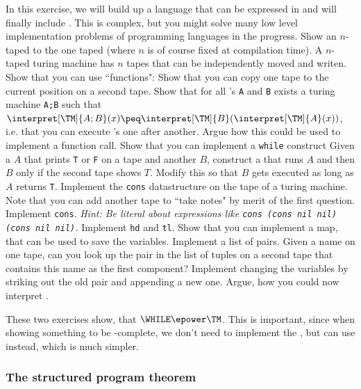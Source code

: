 \begin{Exercise}[title={Interpreter for \WHILE in \TM},difficulty=4]
	In this exercise, we will build up a language that can be expressed in \TM 
	and will finally include \WHILE. This is complex, but you might solve 
	many low level implementation problems of programming languages in the progress.
	\Question Show an $n$-taped \TM to the one taped (where $n$ is of course fixed at
		compilation time). A $n$-taped turing machine has $n$ tapes that can be 
		independently moved and writen.
	\Question Show that you can use ``functions":
		\subQuestion Show that you can copy one tape to the current position on a 
			second tape.
		\subQuestion Show that for all \TM's {\tt A} and {\tt B} exists a turing 
			machine {\tt A;B} such that $\interpret[\TM]{A;B}(x) \peq
			\interpret[\TM]{B}(\interpret[\TM]{A}(x))$, i.e. that you can execute
			\TM's one after another.
		\subQuestion Argue how this could be used to implement a function call.
	\Question Show that you can implement a {\tt while} construct
		\subQuestion Given a \TM $A$ that prints {\tt T} or {\tt F} on a tape and 
			another \TM $B$, construct a  that runs $A$ 
			and then $B$ only if the second tape shows $T$.
		\subQuestion Modify this so that $B$ gets executed as long as $A$ returns {\tt T}.
	\Question Implement the {\tt cons} datastructure on the tape of a turing 
	machine. Note that you can add another tape to ``take notes" by merit of the first question.
		\subQuestion Implement {\tt cons}. {\em Hint: Be literal about 
		expressions like {\tt cons (cons nil nil) (cons nil nil)}.} 
		\subQuestion Implement {\tt hd} and {\tt tl}.
	\Question Show that you can implement a map, that can be used to save the variables.
		\subQuestion Implement a list of pairs.
		\subQuestion Given a name on one tape, can you look up the pair in the 
			list of tuples on a second tape that contains this name as the first
			component?
		\subQuestion Implement changing the variables by striking out the old 
			pair and appending a new one.
	\Question Argue, how you could now interpret \WHILE.
\end{Exercise}

These two exercises show, that $\WHILE\epower\TM$. This is important, since 
when showing something to be \WHILE-complete, we don't need to implement the 
\WHILE, but can use \TM instead, which is much simpler.

\subsubsection{The structured program theorem}


